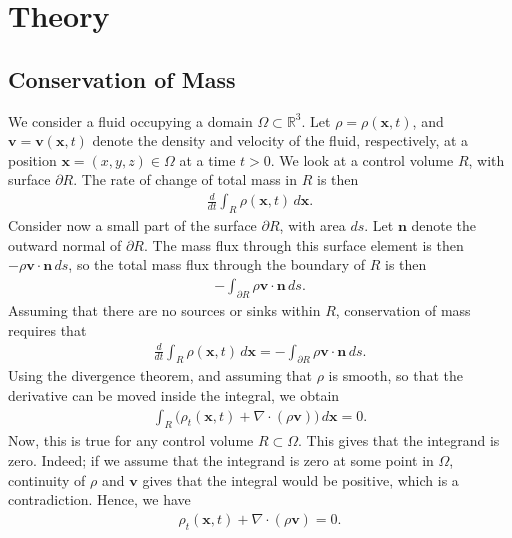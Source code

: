 
\chapter{Theory} %

\label{Chapter2} %

\section{Conservation of Mass}

We consider a fluid occupying a domain $\Omega \subset \mathbb{R}^3$. Let $\rho = \rho(\bm{x}, t)$, and
$\bm{v} = \bm{v}(\bm{x},t)$ denote the density and velocity of the fluid, respectively, at a position
$\bm{x} = (x,y,z) \in \Omega$ at a time $t > 0$. We look at a control volume $R$, with surface $\partial R$.
The rate of change of total mass in $R$ is then
\begin{align}
    \frac{d}{d t}\int_R \rho(\bm{x},t) \, d \bm{x}.
\end{align}
Consider now a small part of the surface $\partial R$, with area $ds$. Let $\bm{n}$ denote the outward normal
of $\partial R$. The mass flux through this surface element is then $-\rho \bm{v} \cdot \bm{n} \, ds$, so the
total mass flux through the boundary of $R$ is then
\begin{align}
    -\int_{\partial R}\rho \bm{v} \cdot \bm{n} \, ds.
\end{align}
Assuming that there are no sources or sinks within $R$, conservation of mass requires that
\begin{align}
    \frac{d}{d t}\int_R \rho(\bm{x},t) \, d \bm{x}
                            = -\int_{\partial R}\rho \bm{v} \cdot \bm{n} \, ds.
\end{align}
Using the divergence theorem, and assuming that $\rho$ is smooth, so that the derivative can be moved inside
the integral, we obtain
\begin{align}
    \int_R \big(\rho_t(\bm{x},t) + \nabla \cdot (\rho \bm{v}) \big) \, d \bm{x} = 0.
\end{align}
Now, this is true for any control volume $R \subset \Omega$. This gives that the integrand is zero. Indeed;
if we assume that the integrand is zero at some point in $\Omega$, continuity of $\rho$ and $\bm{v}$
gives that the integral would be positive, which is a contradiction. Hence, we have
\begin{align}
    \rho_t(\bm{x},t) + \nabla \cdot (\rho \bm{v}) = 0.
\end{align}

